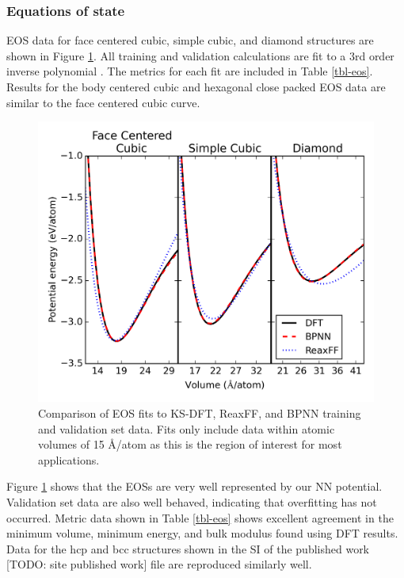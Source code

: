 \documentclass[12pt]{cmuthesis}
\begin{document}
\subsubsection{Equations of state}
\label{sec:org7b8c0d1}
EOS data for face centered cubic, simple cubic, and diamond structures are shown in Figure \ref{fig-bulk-eos}. All training and validation calculations are fit to a 3rd order inverse polynomial \cite{alchagirov-2003-reply-commen}. The metrics for each fit are included in Table \ref{tbl-eos}. Results for the body centered cubic and hexagonal close packed EOS data are similar to the face centered cubic curve.

\begin{figure}[h]
\centering
\includegraphics[width=5in]{./images/fig-bulk-eos.png}
\caption{\label{fig-bulk-eos}
Comparison of EOS fits to KS-DFT, ReaxFF, and BPNN training and validation set data. Fits only include data within atomic volumes of \textpm{} 15 \AA{}/atom as this is the region of interest for most applications.}
\end{figure}

Figure \ref{fig-bulk-eos} shows that the EOSs are very well represented by our NN potential. Validation set data are also well behaved, indicating that overfitting has not occurred. Metric data shown in Table \ref{tbl-eos} shows excellent agreement in the minimum volume, minimum energy, and bulk modulus found using DFT results. Data for the hcp and bcc structures shown in the SI of the published work [TODO: site published work] file are reproduced similarly well.
\end{document}
